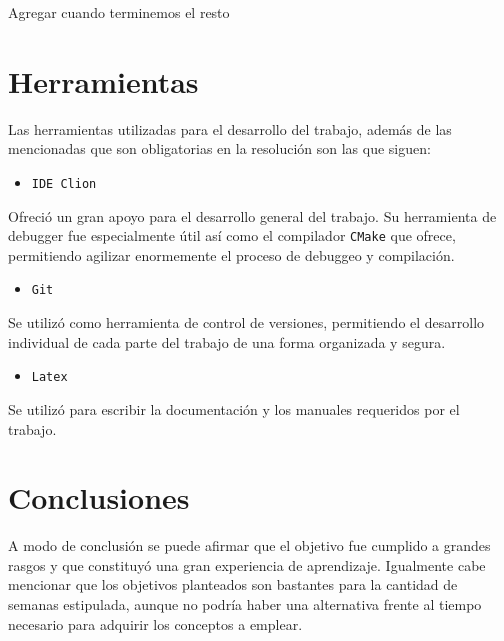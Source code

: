 \documentclass[a4paper]{article}
\begin{document}
Agregar cuando terminemos el resto

\section{Herramientas}

Las herramientas utilizadas para el desarrollo del trabajo, además de las mencionadas que son obligatorias en la resolución son las que siguen:

\begin{itemize}
	\item \texttt{IDE Clion}
\end{itemize}

Ofreció un gran apoyo para el desarrollo general del trabajo. Su herramienta de debugger fue especialmente útil así como el compilador \texttt{CMake} que ofrece, permitiendo agilizar enormemente el proceso de debuggeo y compilación.

\begin{itemize}
	\item \texttt{Git}
\end{itemize}

Se utilizó como herramienta de control de versiones, permitiendo el desarrollo individual de cada parte del trabajo de una forma organizada y segura.

\begin{itemize}
	\item \texttt{Latex} 
\end{itemize} 

Se utilizó para escribir la documentación y los manuales requeridos por el trabajo.

\section{Conclusiones}

A modo de conclusión se puede afirmar que el objetivo fue cumplido a grandes rasgos y que constituyó una gran experiencia de aprendizaje. Igualmente cabe mencionar que los objetivos planteados son bastantes para la cantidad de semanas estipulada, aunque no podría haber una alternativa frente al tiempo necesario para adquirir los conceptos a emplear.
\end{document}
